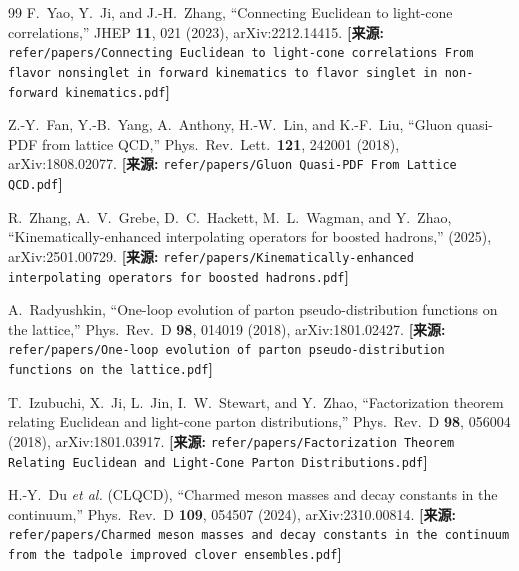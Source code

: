 \documentclass[12pt,a4paper]{ctexart}
\theoremstyle{definition}
\begin{document}
\begin{thebibliography}{99}
F.~Yao, Y.~Ji, and J.-H.~Zhang,
``Connecting Euclidean to light-cone correlations,''
JHEP \textbf{11}, 021 (2023), arXiv:2212.14415.
\quad\textbf{[来源:} \texttt{refer/papers/Connecting Euclidean to light-cone correlations From flavor nonsinglet in forward kinematics to flavor singlet in non-forward kinematics.pdf}\textbf{]}

Z.-Y.~Fan, Y.-B.~Yang, A.~Anthony, H.-W.~Lin, and K.-F.~Liu,
``Gluon quasi-PDF from lattice QCD,''
Phys.\ Rev.\ Lett.\ \textbf{121}, 242001 (2018), arXiv:1808.02077.
\quad\textbf{[来源:} \texttt{refer/papers/Gluon Quasi-PDF From Lattice QCD.pdf}\textbf{]}

R.~Zhang, A.~V.~Grebe, D.~C.~Hackett, M.~L.~Wagman, and Y.~Zhao,
``Kinematically-enhanced interpolating operators for boosted hadrons,''
(2025), arXiv:2501.00729.
\quad\textbf{[来源:} \texttt{refer/papers/Kinematically-enhanced interpolating operators for boosted hadrons.pdf}\textbf{]}

A.~Radyushkin,
``One-loop evolution of parton pseudo-distribution functions on the lattice,''
Phys.\ Rev.\ D \textbf{98}, 014019 (2018), arXiv:1801.02427.
\quad\textbf{[来源:} \texttt{refer/papers/One-loop evolution of parton pseudo-distribution functions on the lattice.pdf}\textbf{]}

T.~Izubuchi, X.~Ji, L.~Jin, I.~W.~Stewart, and Y.~Zhao,
``Factorization theorem relating Euclidean and light-cone parton distributions,''
Phys.\ Rev.\ D \textbf{98}, 056004 (2018), arXiv:1801.03917.
\quad\textbf{[来源:} \texttt{refer/papers/Factorization Theorem Relating Euclidean and Light-Cone Parton Distributions.pdf}\textbf{]}

H.-Y.~Du \textit{et al.} (CLQCD),
``Charmed meson masses and decay constants in the continuum,''
Phys.\ Rev.\ D \textbf{109}, 054507 (2024), arXiv:2310.00814.
\quad\textbf{[来源:} \texttt{refer/papers/Charmed meson masses and decay constants in the continuum from the tadpole improved clover ensembles.pdf}\textbf{]}

\end{thebibliography}
\end{document}
